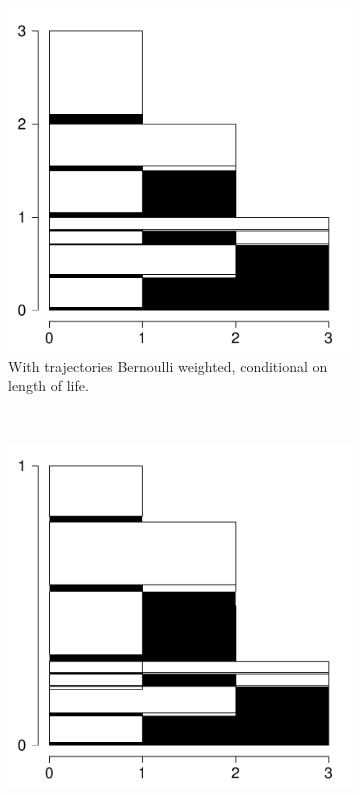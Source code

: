 \documentclass[a4paper]{article}
\begin{document}
\begin{figure}
     \begin{subfigure}[b]{0.4\textwidth}
        \includegraphics[scale=.4]{Figures/BernCondTrajProbs.pdf}
        \caption{With trajectories Bernoulli weighted, conditional on length of life.}
        \label{fig:b3}
    \end{subfigure}
    ~ 
    \begin{subfigure}[b]{0.4\textwidth}
        \includegraphics[scale=.4]{Figures/BernTrajProbsWeighted}

\end{subfigure}
\end{figure}
\end{document}
